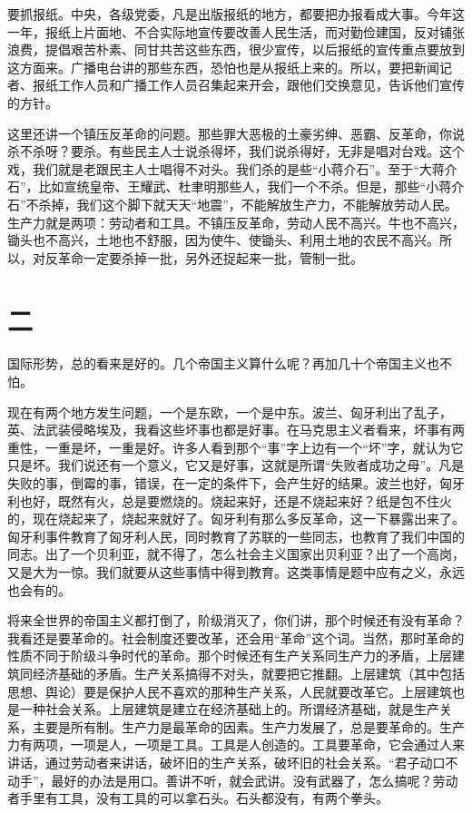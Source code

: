 要抓报纸。中央，各级党委，凡是出版报纸的地方，都要把办报看成大事。今年这一年，报纸上片面地、不合实际地宣传要改善人民生活，而对勤俭建国，反对铺张浪费，提倡艰苦朴素、同甘共苦这些东西，很少宣传，以后报纸的宣传重点要放到这方面来。广播电台讲的那些东西，恐怕也是从报纸上来的。所以，要把新闻记者、报纸工作人员和广播工作人员召集起来开会，跟他们交换意见，告诉他们宣传的方针。

这里还讲一个镇压反革命的问题。那些罪大恶极的土豪劣绅、恶霸、反革命，你说杀不杀呀？要杀。有些民主人士说杀得坏，我们说杀得好，无非是唱对台戏。这个戏，我们就是老跟民主人士唱得不对头。我们杀的是些“小蒋介石”。至于“大蒋介石”，比如宣统皇帝、王耀武、杜聿明那些人，我们一个不杀。但是，那些“小蒋介石”不杀掉，我们这个脚下就天天“地震”，不能解放生产力，不能解放劳动人民。生产力就是两项：劳动者和工具。不镇压反革命，劳动人民不高兴。牛也不高兴，锄头也不高兴，土地也不舒服，因为使牛、使锄头、利用土地的农民不高兴。所以，对反革命一定要杀掉一批，另外还捉起来一批，管制一批。

\section*{二}

国际形势，总的看来是好的。几个帝国主义算什么呢？再加几十个帝国主义也不怕。

现在有两个地方发生问题，一个是东欧，一个是中东。波兰、匈牙利出了乱子，英、法武装侵略埃及，我看这些坏事也都是好事。在马克思主义者看来，坏事有两重性，一重是坏，一重是好。许多人看到那个“事”字上边有一个“坏”字，就认为它只是坏。我们说还有一个意义，它又是好事，这就是所谓“失败者成功之母”。凡是失败的事，倒霉的事，错误，在一定的条件下，会产生好的结果。波兰也好，匈牙利也好，既然有火，总是要燃烧的。烧起来好，还是不烧起来好？纸是包不住火的，现在烧起来了，烧起来就好了。匈牙利有那么多反革命，这一下暴露出来了。匈牙利事件教育了匈牙利人民，同时教育了苏联的一些同志，也教育了我们中国的同志。出了一个贝利亚，就不得了，怎么社会主义国家出贝利亚？出了一个高岗，又是大为一惊。我们就要从这些事情中得到教育。这类事情是题中应有之义，永远也会有的。

将来全世界的帝国主义都打倒了，阶级消灭了，你们讲，那个时候还有没有革命？我看还是要革命的。社会制度还要改革，还会用“革命”这个词。当然，那时革命的性质不同于阶级斗争时代的革命。那个时候还有生产关系同生产力的矛盾，上层建筑同经济基础的矛盾。生产关系搞得不对头，就要把它推翻。上层建筑（其中包括思想、舆论）要是保护人民不喜欢的那种生产关系，人民就要改革它。上层建筑也是一种社会关系。上层建筑是建立在经济基础上的。所谓经济基础，就是生产关系，主要是所有制。生产力是最革命的因素。生产力发展了，总是要革命的。生产力有两项，一项是人，一项是工具。工具是人创造的。工具要革命，它会通过人来讲话，通过劳动者来讲话，破坏旧的生产关系，破坏旧的社会关系。“君子动口不动手”，最好的办法是用口。善讲不听，就会武讲。没有武器了，怎么搞呢？劳动者手里有工具，没有工具的可以拿石头。石头都没有，有两个拳头。

